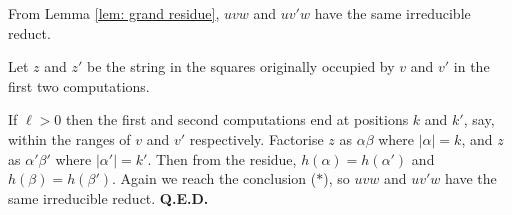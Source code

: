 \noindent
From Lemma \ref{lem: grand residue},
$uvw$ and $uv'w$ have the same irreducible reduct.

Let $z$ and $z'$ be
the string in the squares originally occupied by $v$
and $v'$ in the first two computations.

If $\ell>0$ then the first and second computations
end at positions $k$ and $k'$, say, within the ranges
of $v$ and $v'$ respectively.  Factorise $z$ as $\alpha\beta$
where $|\alpha|=k$, and $z$ as $\alpha'\beta'$ where $|\alpha'|=k'$.
Then from the residue, $h(\alpha) = h(\alpha')$ and $h(\beta)=h(\beta')$.
Again we reach the conclusion ($*$), so $uvw$ and
$uv'w$ have the same irreducible reduct. {\bf Q.E.D.}\medskip
